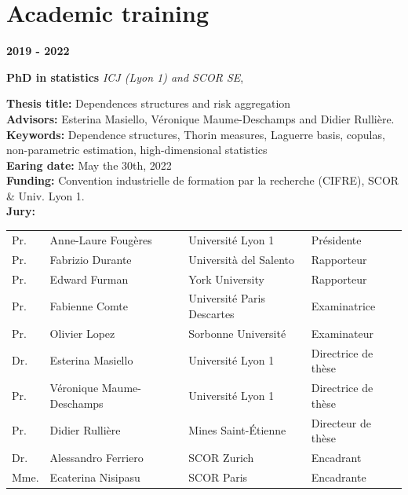 \documentclass[a4paper,11pt]{article}
\newcommand{\tabcv}[2]{
\begin{minipage}[t]{0.12\linewidth}
\textbf{\footnotesize #1}
\end{minipage}\hfill
\begin{minipage}[t]{0.85\linewidth}
#2
\end{minipage}
\vspace{1em}
}
\newcommand{\bull}[1]{\textbf{#1}}
\begin{document}
\section{Academic training}\label{subsec:formation_academique}

\tabcv{2019 - 2022}{
\textbf{PhD in statistics} \;\textit{ICJ (Lyon 1) and SCOR SE},\\[0.5em]
{\footnotesize 
  \bull{Thesis title:} {Dependences structures and risk aggregation}\\
  \bull{Advisors:} Esterina Masiello, Véronique Maume-Deschamps and Didier Rullière.\\
  \bull{Keywords:} {Dependence structures, Thorin measures, Laguerre basis, copulas, non-parametric estimation, high-dimensional statistics}\\
  \bull{Earing date:} May the 30th, 2022\\
  \bull{Funding:} Convention industrielle de formation par la recherche (CIFRE), SCOR \& Univ. Lyon 1.\\
  \bull{Jury:} \\[0.25em]
  \begin{tabular}{llll}
    {Pr.} & {Anne-Laure Fougères}       & {Université Lyon 1} & {Présidente} \\
    {Pr.} & {Fabrizio Durante}          & {Università del Salento} & {Rapporteur} \\
    {Pr.} & {Edward Furman}             & {York University} & {Rapporteur} \\
    {Pr.} & {Fabienne Comte}            & {Université Paris Descartes} & {Examinatrice} \\
    {Pr.} & {Olivier Lopez}             & {Sorbonne Université} & {Examinateur} \\
    {Dr.} & {Esterina Masiello}         & {Université Lyon 1} & {Directrice de thèse} \\
    {Pr.} & {Véronique Maume-Deschamps} & {Université Lyon 1} & {Directrice de thèse} \\
    {Pr.} & {Didier Rullière}           & {Mines Saint-Étienne} & {Directeur de thèse} \\
    {Dr.} & {Alessandro Ferriero}       & {SCOR Zurich} & {Encadrant} \\
    {Mme.} & {Ecaterina Nisipasu}       & {SCOR Paris} & {Encadrante} \\
  \end{tabular}
}
}
\end{document}
